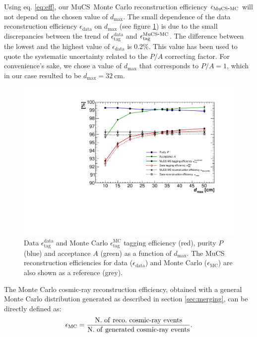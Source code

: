 \documentclass[a4paper]{scrartcl}
\def\myhyphen{{\hbox{-}}}
\begin{document}
Using eq. \eqref{eq:eff}, our MuCS Monte Carlo reconstruction efficiency $\epsilon_{\mathrm{MuCS\myhyphen MC}}$ will not depend on the chosen value of $d_{\mathrm{max}}$. The small dependence of the data reconstruction efficiency $\epsilon_{\mathrm{data}}$ on $d_{\mathrm{max}}$ (see figure \ref{fig:purity}) is due to the small discrepancies between the trend of $\epsilon^{\mathrm{data}}_{\mathrm{tag}}$ and $\epsilon^{\mathrm{MuCS\myhyphen MC}}_{\mathrm{tag}}$. The difference between the lowest and the highest value of $\epsilon_{\mathrm{data}}$ is 0.2\%. This value has been used to quote the systematic uncertainty related to the $P/A$ correcting factor.
For convenience's sake, we chose a value of $d_{\mathrm{max}}$ that corresponds to $P/A = 1$, which in our case resulted to be $d_{\mathrm{max}}=32~\mathrm{cm}$.


\begin{figure}[htbp]
  \begin{center}
    \includegraphics[width=0.7\linewidth]{figures/purity.pdf}
    \caption{Data $\epsilon^{\mathrm{data}}_{\mathrm{tag}}$ and Monte Carlo $\epsilon^{\mathrm{MC}}_{\mathrm{tag}}$ tagging efficiency (red), purity $P$ (blue) and acceptance $A$ (green) as a function of $d_{\mathrm{max}}$. The MuCS reconstruction efficiencies for data ($\epsilon_{\mathrm{data}}$) and Monte Carlo ($\epsilon_{\mathrm{MC}}$) are also shown as a reference (grey).} \label{fig:purity}
  \end{center}
\end{figure}

The Monte Carlo cosmic-ray reconstruction efficiency, obtained with a general Monte Carlo distribution generated as described in section \ref{sec:merging}, can be directly defined as:
\begin{equation}
  \epsilon_{\mathrm{MC}} = \frac{\mathrm{N.~of~reco.~cosmic\myhyphen ray~events}}{\mathrm{N.~of~generated~cosmic\myhyphen ray~events}}.
\end{equation}
\end{document}
